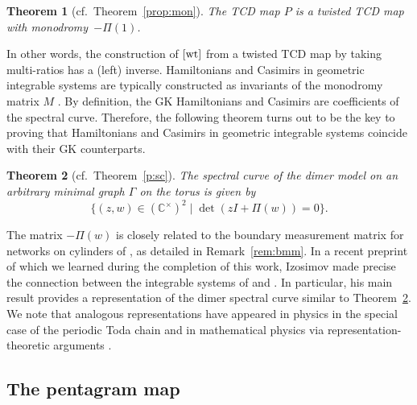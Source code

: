 \documentclass[pdftex]{sigma}
\numberwithin{equation}{section}
\newtheorem{Theorem}{Theorem}[section]
\newcommand{\C}{{\mathbb C}}
\newcommand{\wt}{{\rm wt}}
\begin{document}
	\begin{Theorem}[cf.\ Theorem~\ref{prop:mon}]
		The TCD map $P$ is a twisted TCD map with monodro\-my~$-\Pi(1)$.	
	\end{Theorem}
	In other words, the construction of $[\wt]$ from a twisted TCD map by taking multi-ratios has a (left) inverse. Hamiltonians and Casimirs in geometric integrable systems are typically constructed as invariants of the monodromy matrix $M$ \cite{GSTV, KhesinSoloviev, OST1, Soloviev}. By definition, the GK Hamiltonians and Casimirs are coefficients of the spectral curve. Therefore, the following theorem turns out to be the key to proving that Hamiltonians and Casimirs in geometric integrable systems coincide with their GK counterparts.
	\begin{Theorem}[cf.\ Theorem~\ref{p:sc}]
		\label{thm:spectralbm}
		The spectral curve of the dimer model on an arbitrary minimal graph $\Gamma$ on the torus is given by
		\[
		\bigl\{(z,w)\in(\C^\times)^2 \mid \det (zI+\Pi(w))=0\bigr\}.
		\]
	\end{Theorem}
	The matrix $-\Pi(w)$ is closely related to the boundary measurement matrix for networks on cylinders of \cite{GSTV, GSV}, as detailed in Remark~\ref{rem:bmm}. In a recent preprint of which we learned during the completion of this work, Izosimov \cite{Izosimov1} made precise the connection between the integrable systems of \cite{GK13} and \cite{GSTV}. In particular, his main result provides a representation of the dimer spectral curve similar to Theorem~\ref{thm:spectralbm}. We note that analogous representations have appeared in physics in the special case of the periodic Toda chain \cite{EFS} and in mathematical physics via representation-theoretic arguments \cite{FM16}.
	
	
	\subsection{The pentagram map}
	
\end{document}
